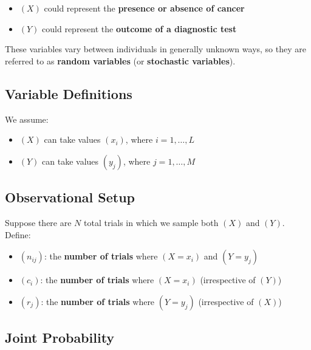 \documentclass[
  12 pt,
  a4paper,
]{book}
\providecommand{\tightlist}{%
  \setlength{\itemsep}{0pt}\setlength{\parskip}{0pt}}
\numberwithin{equation}{section}
\theoremstyle{plain}      %
\theoremstyle{definition} %
\theoremstyle{remark}     %
\theoremstyle{note}         %
\begin{document}
\begin{itemize}
\tightlist
\item
  \((X)\) could represent the \textbf{presence or absence of cancer}
\item
  \((Y)\) could represent the \textbf{outcome of a diagnostic test}
\end{itemize}

These variables vary between individuals in generally unknown ways, so
they are referred to as \textbf{random variables} (or \textbf{stochastic
variables}).

\hypertarget{variable-definitions}{%
\subsection{Variable Definitions}\label{variable-definitions}}

We assume:

\begin{itemize}
\tightlist
\item
  \((X)\) can take values \((x_i)\), where \(i = 1, \ldots, L\)
\item
  \((Y)\) can take values \((y_j)\), where \(j = 1, \ldots, M\)
\end{itemize}

\hypertarget{observational-setup}{%
\subsection{Observational Setup}\label{observational-setup}}

Suppose there are \(N\) total trials in which we sample both \((X)\) and
\((Y)\). Define:

\begin{itemize}
\tightlist
\item
  \((n_{ij})\): the \textbf{number of trials} where \((X = x_i)\) and
  \((Y = y_j)\)
\item
  \((c_i)\): the \textbf{number of trials} where \((X = x_i)\)
  (irrespective of \((Y)\))
\item
  \((r_j)\): the \textbf{number of trials} where \((Y = y_j)\)
  (irrespective of \((X)\))
\end{itemize}

\hypertarget{joint-probability}{%
\subsection{Joint Probability}\label{joint-probability}}
\end{document}
